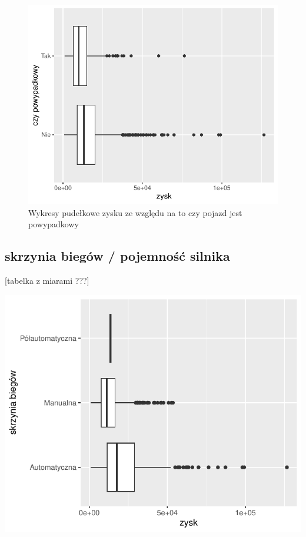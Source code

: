 \documentclass{article}\usepackage[]{graphicx}\usepackage[]{xcolor}
\makeatletter
\def\maxwidth{ %
  \ifdim\Gin@nat@width>\linewidth
    \linewidth
  \else
    \Gin@nat@width
  \fi
}
\newenvironment{knitrout}{}{} %
\makeatother
\begin{document}
\begin{knitrout}
\color{fgcolor}\begin{figure}

{\centering \includegraphics[width=\maxwidth]{figure/fig_wypadkowy-1} 

}

\caption[Wykresy pudełkowe zysku ze względu na to czy pojazd jest powypadkowy]{Wykresy pudełkowe zysku ze względu na to czy pojazd jest powypadkowy}\label{fig:fig_wypadkowy}
\end{figure}

\end{knitrout}

\subsection{skrzynia biegów / pojemność silnika}

[tabelka z miarami ???]

\begin{knitrout}
\color{fgcolor}

{\centering \includegraphics[width=\maxwidth]{figure/unnamed-chunk-8-1} 

}


\end{knitrout}
\end{document}

